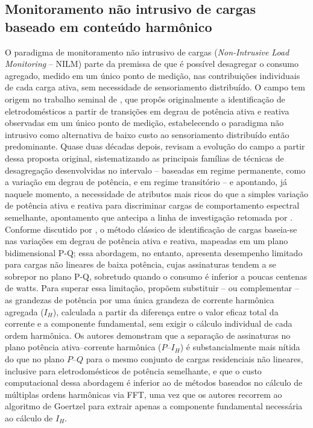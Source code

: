 \documentclass[times,final]{elsarticle}
\begin{document}
\subsection{Monitoramento não intrusivo de cargas baseado em conteúdo harmônico}
O paradigma de monitoramento não intrusivo de cargas (\textit{Non-Intrusive Load Monitoring} -- NILM) parte da premissa de que é possível desagregar o consumo agregado, medido em um único ponto de medição, nas contribuições individuais de cada carga ativa, sem necessidade de sensoriamento distribuído. O campo tem origem no trabalho seminal de \citet{hart1992}, que propôs originalmente a identificação de eletrodomésticos a partir de transições em degrau de potência ativa e reativa observadas em um único ponto de medição, estabelecendo o paradigma não intrusivo como alternativa de baixo custo ao sensoriamento distribuído então predominante. Quase duas décadas depois, \citet{zeifman2011} revisam a evolução do campo a partir dessa proposta original, sistematizando as principais famílias de técnicas de desagregação desenvolvidas no intervalo -- baseadas em regime permanente, como a variação em degrau de potência, e em regime transitório -- e apontando, já naquele momento, a necessidade de atributos mais ricos do que a simples variação de potência ativa e reativa para discriminar cargas de comportamento espectral semelhante, apontamento que antecipa a linha de investigação retomada por \citet{djordjevic2017}. Conforme discutido por \citet{djordjevic2017}, o método clássico de identificação de cargas baseia-se nas variações em degrau de potência ativa e reativa, mapeadas em um plano bidimensional P-Q; essa abordagem, no entanto, apresenta desempenho limitado para cargas não lineares de baixa potência, cujas assinaturas tendem a se sobrepor no plano P-Q, sobretudo quando o consumo é inferior a poucas centenas de watts.
Para superar essa limitação, \citet{djordjevic2017} propõem substituir -- ou complementar -- as grandezas de potência por uma única grandeza de corrente harmônica agregada ($I_H$), calculada a partir da diferença entre o valor eficaz total da corrente e a componente fundamental, sem exigir o cálculo individual de cada ordem harmônica. Os autores demonstram que a separação de assinaturas no plano potência ativa--corrente harmônica ($P$--$I_H$) é substancialmente mais nítida do que no plano $P$--$Q$ para o mesmo conjunto de cargas residenciais não lineares, inclusive para eletrodomésticos de potência semelhante, e que o custo computacional dessa abordagem é inferior ao de métodos baseados no cálculo de múltiplas ordens harmônicas via FFT, uma vez que os autores recorrem ao algoritmo de Goertzel para extrair apenas a componente fundamental necessária ao cálculo de $I_H$.
\end{document}
